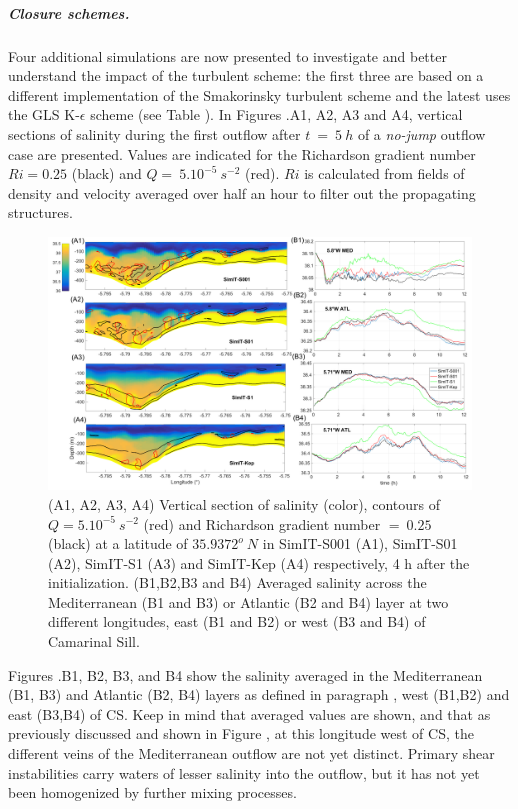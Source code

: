 \subparagraph{Closure schemes.}

Four additional simulations are now presented to investigate and better understand the impact of the turbulent scheme: the first three are based on a different implementation of the Smakorinsky turbulent scheme and the latest uses the GLS K-$\epsilon$ scheme (see Table ). 
In Figures .A1, A2, A3 and A4, vertical sections of salinity during the first outflow after $t\ =\ 5\ h$ of a \textit{no-jump} outflow case are presented. Values are indicated for the Richardson gradient number $Ri=0.25$ (black) and $Q =\ 5.10^{-5} \ s^{-2}$ (red). $Ri$ is calculated from fields of density and velocity averaged over half an hour to filter out the propagating structures.

\begin{figure}[!h]
 \includegraphics[width=\textwidth]{./GBR3D/Figsmago.png}
 \caption [Vertical section of salinity and averaged salinity in atlantic and mediterranean layers.]{ (A1, A2, A3, A4) Vertical section of salinity (color), contours of $Q = 5.10^{-5} \ s^{-2}$ (red) and Richardson gradient number $=\ 0.25$ (black) at a latitude of $35.9372^o\ N$ in SimIT-S001 (A1), SimIT-S01 (A2), SimIT-S1 (A3) and SimIT-Kep (A4) respectively, 4 h after the initialization. (B1,B2,B3 and B4) Averaged salinity across the Mediterranean (B1 and B3) or Atlantic (B2 and B4) layer at two different longitudes, east (B1 and B2) or west (B3 and B4) of Camarinal Sill.}
 \label{Fig3Dsch}
\end{figure}

Figures .B1, B2, B3, and B4 show the salinity averaged in the Mediterranean (B1, B3) and Atlantic (B2, B4) layers as defined in paragraph , west (B1,B2) and east (B3,B4) of CS. Keep in mind that averaged values are shown, and that as previously discussed and shown in Figure , at this longitude west of CS, the different veins of the Mediterranean outflow are not yet distinct. Primary shear instabilities carry waters of lesser salinity into the outflow, but it has not yet been homogenized by further mixing processes.

